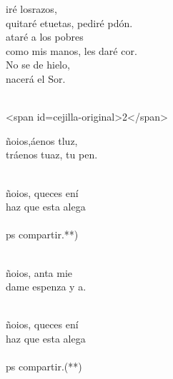 \documentclass[12pt]{article}
\begin{document}
\begin{multicols*}{2}
\begin{cancion}
\begin{chorus}
	iré losrazos, \\
	quitaré etuetas, pediré pdón.\\
	ataré a los pobres \\
	como mis manos, les daré cor.\\
	No se de hielo, \\
	nacerá el Sor.\\
	\end{chorus}%
	\jump\\
<span id=cejilla-original>2</span>\\
\end{cancion}%

\begin{cancion}%
	ñoios,áenos tluz,\\
	tráenos tuaz, tu pen. \\\jump\\
	\begin{chorus}%
	ñoios, queces ení\\
	haz que esta alega \\
{}\vspace*{-0.4cm}\\
	ps compartir.\chord{}{)}{(}**)\\
	\end{chorus}%
	\jump\\
	ñoios, anta mie\\
	dame espenza y a.\\\jump\\
	\begin{chorus}%
	ñoios, queces ení\\
	haz que esta alega \\
{}\vspace*{-0.4cm}\\
	ps compartir.\chord{}{)}{ }(**)\\
	\end{chorus}%
	\jump\\
\end{cancion}%


\end{multicols*}
\end{document}
